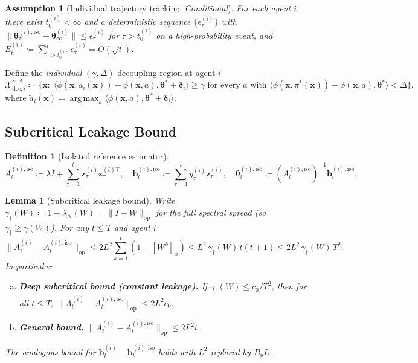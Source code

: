 \documentclass[11pt]{article}
\newtheorem{lemma}[theorem]{Lemma}
\newtheorem{definition}[theorem]{Definition}
\newtheorem{assumption}[theorem]{Assumption}
\DeclareMathOperator*{\argmax}{arg\,max}
\begin{document}
\begin{assumption}[Individual trajectory tracking. \emph{Conditional}]
\label{ass:pol_conv_ind}
For each agent $i$ there exist $t_0^{(i)}<\infty$ and a deterministic
sequence $\{\epsilon_\tau^{(i)}\}$ with
$\|\bm{\theta}_\tau^{(i),\mathrm{iso}}-\bm{\theta}_\infty^{(i)}\|
\leq\epsilon_\tau^{(i)}$ for $\tau>t_0^{(i)}$ on a high-probability
event, and $E_t^{(i)}\coloneqq\sum_{\tau>t_0^{(i)}}^t\epsilon_\tau^{(i)}
=O(\sqrt t)$.
\end{assumption}

Define the \emph{individual} $(\gamma,\Delta)$-decoupling region at
agent $i$ \[
\mathcal{X}_{\mathrm{dec},i}^{\gamma,\Delta}\coloneqq
\bigl\{\bm{x}:\;
\langle\phi(\bm{x},\tilde{a}_i(\bm{x}))-\phi(\bm{x},a),
\bm{\theta}^{\!*}+\bm{\delta}_i\rangle\geq\gamma
\text{ for every }a\text{ with }
\langle\phi(\bm{x},\pi^{\!*}(\bm{x}))-\phi(\bm{x},a),\bm{\theta}^{\!*}\rangle<\Delta
\bigr\},
\]
where $\tilde{a}_i(\bm{x})=\argmax_a\langle\phi(\bm{x},a),\bm{\theta}^{\!*}+\bm{\delta}_i\rangle$.

\subsection{Subcritical Leakage Bound}

\begin{definition}[Isolated reference estimator]
\[
A_t^{(i),\mathrm{iso}}\coloneqq\lambda I+\sum_{\tau=1}^t
\bm{z}_\tau^{(i)}\bm{z}_\tau^{(i)\top},\quad
\bm{b}_t^{(i),\mathrm{iso}}\coloneqq\sum_{\tau=1}^t
y_\tau^{(i)}\bm{z}_\tau^{(i)},\quad
\bm{\theta}_t^{(i),\mathrm{iso}}\coloneqq(A_t^{(i),\mathrm{iso}})^{-1}
\bm{b}_t^{(i),\mathrm{iso}}.
\]
\end{definition}

\begin{lemma}[Subcritical leakage bound]\label{lem:leakage}
Write $\gamma_\dagger(W)\coloneqq 1-\lambda_N(W)=\|I-W\|_{\mathrm{op}}$
for the \emph{full} spectral spread (so $\gamma_\dagger\geq\gamma(W)$).
For any $t\leq T$ and agent $i$ \begin{equation}
\|A_t^{(i)}-A_t^{(i),\mathrm{iso}}\|_{\mathrm{op}}
\leq 2L^2\sum_{k=1}^t(1-[W^k]_{ii})
\leq L^2\,\gamma_\dagger(W)\,t(t+1)
\leq 2L^2\,\gamma_\dagger(W)\,T^2.
\label{eq:leakage_exact}
\end{equation}
In particular \begin{enumerate}[(a)]
\item \textbf{Deep subcritical bound (constant leakage).}
If $\gamma_\dagger(W)\leq c_0/T^2$, then for all $t\leq T$,
$\|A_t^{(i)}-A_t^{(i),\mathrm{iso}}\|_{\mathrm{op}}\leq 2L^2 c_0$.
\item \textbf{General bound.}
$\|A_t^{(i)}-A_t^{(i),\mathrm{iso}}\|_{\mathrm{op}}\leq 2L^2 t$.
\end{enumerate}
The analogous bound for $\bm{b}_t^{(i)}-\bm{b}_t^{(i),\mathrm{iso}}$
holds with $L^2$ replaced by $B_y L$.
\end{lemma}
\end{document}

